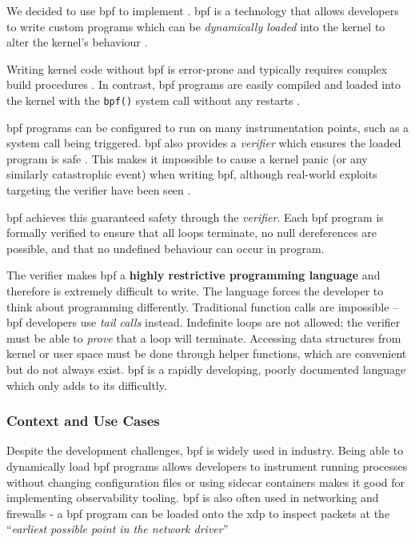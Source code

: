 We decided to use \ac{bpf} to implement \af. \ac{bpf} is a technology
that allows developers to write custom programs which can be \textit{dynamically
loaded} into the kernel to alter the kernel's behaviour \cite{LEARNING_EBPF}.

Writing kernel code without \ac{bpf} is error-prone and typically
requires complex build procedures \cite{UNDERSTANDING_LINUX_KERNEL}. In contrast,
\ac{bpf} programs are easily compiled and loaded into the kernel with the
\texttt{bpf()} system call without any restarts \cite{bpf-man-pages}.

\ac{bpf} programs can be configured to run on many instrumentation points, such
as a system call being triggered. \ac{bpf} also provides a \textit{verifier} which
ensures the  loaded program is safe \cite{LEARNING_EBPF}. This makes it
impossible to cause a kernel panic (or any similarly catastrophic event) when
writing \ac{bpf}, although real-world exploits targeting the verifier have
been seen \cite{BPF_VERIFIER_EXPLOIT}.  

\ac{bpf} achieves this guaranteed safety through the \textit{verifier}. Each
\ac{bpf} program is formally verified to ensure that all loops terminate, no
null dereferences are possible, and that no undefined behaviour can occur in
 program. 

The verifier makes \ac{bpf} a \textbf{highly restrictive programming language}
and therefore is extremely difficult to write. The language forces the
developer to think about programming differently. Traditional function calls
are impossible -- \ac{bpf} developers use \textit{tail calls} instead. Indefinite
loops are not allowed; the verifier must be able to \textit{prove} that a loop
will terminate. Accessing data structures from kernel or user space must be
done through helper functions, which are convenient but do not always exist. \ac{bpf}
is a rapidly developing, poorly documented language which only adds to its 
difficultly.

\subsubsection{Context and Use Cases}

Despite the development challenges, \ac{bpf} is widely used in industry. Being able to
dynamically load \ac{bpf} programs allows developers to instrument running processes
without changing configuration files or using sidecar containers \cite{SIDECAR}
makes it good for implementing observability tooling.
\ac{bpf} is also often used in networking and firewalls 
\cite{LINUX_NETWORKING_OBSERVABILITY} - a \ac{bpf} program can be loaded 
onto the \ac{xdp} to inspect packets at the 
``\textit{earliest possible point in the network driver}'' 

